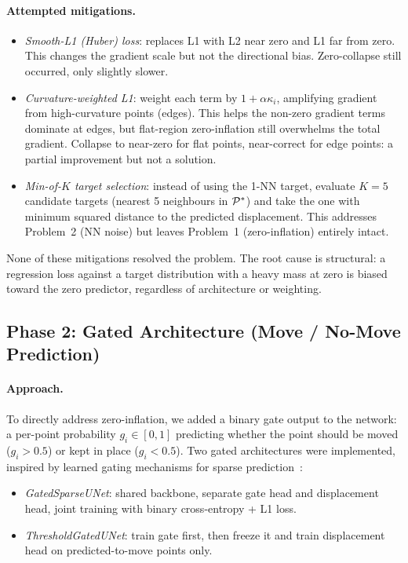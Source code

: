 \paragraph{Attempted mitigations.}
\begin{itemize}
  \item \textit{Smooth-L1 (Huber) loss}: replaces L1 with L2 near zero and
    L1 far from zero. This changes the gradient scale but not the directional
    bias. Zero-collapse still occurred, only slightly slower.

  \item \textit{Curvature-weighted L1}: weight each term by $1 + \alpha\kappa_i$,
    amplifying gradient from high-curvature points (edges).
    This helps the non-zero gradient terms dominate at edges,
    but flat-region zero-inflation still overwhelms the total gradient.
    Collapse to near-zero for flat points, near-correct for edge points:
    a partial improvement but not a solution.

  \item \textit{Min-of-$K$ target selection}: instead of using the 1-NN target,
    evaluate $K = 5$ candidate targets (nearest 5 neighbours in $\mathcal{P}^*$) and
    take the one with minimum squared distance to the predicted displacement.
    This addresses Problem~2 (NN noise) but leaves Problem~1 (zero-inflation)
    entirely intact.
\end{itemize}

None of these mitigations resolved the problem.
The root cause is structural: a regression loss against a target distribution
with a heavy mass at zero is biased toward the zero predictor, regardless of
architecture or weighting.

\subsection{Phase 2: Gated Architecture (Move / No-Move Prediction)}

\paragraph{Approach.}
To directly address zero-inflation, we added a binary gate output to the network:
a per-point probability $g_i \in [0, 1]$ predicting whether the point should
be moved ($g_i > 0.5$) or kept in place ($g_i < 0.5$).
Two gated architectures were implemented, inspired by learned gating
mechanisms for sparse prediction~\cite{yu2019freeform}:
\begin{itemize}
  \item \textit{GatedSparseUNet}: shared backbone, separate gate head and
    displacement head, joint training with binary cross-entropy + L1 loss.
  \item \textit{ThresholdGatedUNet}: train gate first, then freeze it and
    train displacement head on predicted-to-move points only.
\end{itemize}

